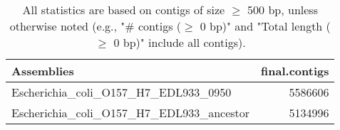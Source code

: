 \documentclass[12pt,a4paper]{article}
\begin{document}
\begin{table}[ht]
\begin{center}
\caption{All statistics are based on contigs of size $\geq$ 500 bp, unless otherwise noted (e.g., "\# contigs ($\geq$ 0 bp)" and "Total length ($\geq$ 0 bp)" include all contigs).}
\begin{tabular}{|l*{1}{|r}|}
\hline
Assemblies & final.contigs \\ \hline
Escherichia\_coli\_O157\_H7\_EDL933\_0950 & 5586606 \\ \hline
Escherichia\_coli\_O157\_H7\_EDL933\_ancestor & 5134996 \\ \hline
\end{tabular}
\end{center}
\end{table}
\end{document}

